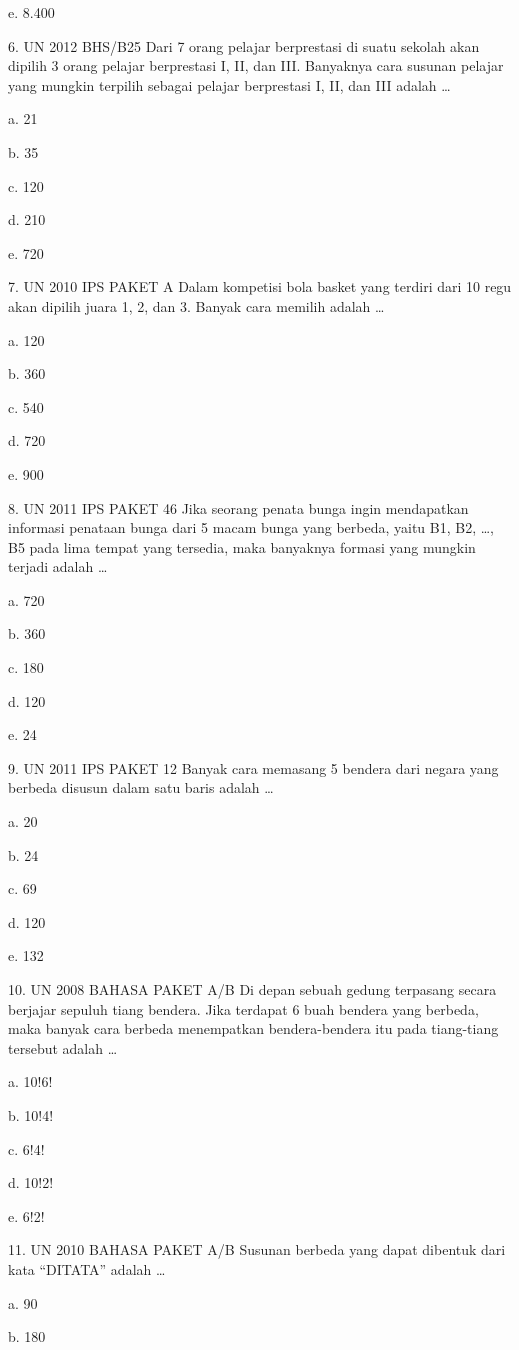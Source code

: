 \documentclass[11pt,fleqn]{book} %
\begin{document}
e.	8.400

6.	UN 2012 BHS/B25
Dari 7 orang pelajar berprestasi di suatu sekolah akan dipilih 3 orang pelajar berprestasi I, II, dan III. Banyaknya cara susunan pelajar yang mungkin terpilih sebagai pelajar berprestasi I, II, dan III adalah …

a.	21

b.	35

c.	120

d.	210

e.	720


7.	UN 2010 IPS PAKET A 
Dalam kompetisi bola basket yang terdiri dari 10 regu akan dipilih juara 1, 2, dan 3. Banyak cara memilih adalah …

a.	120

b.	360

c.	540

d.	720

e.	900

8.	UN 2011 IPS PAKET 46
Jika seorang penata bunga ingin mendapatkan informasi penataan bunga dari 5 macam bunga yang berbeda, yaitu B1, B2, …, B5 pada lima tempat yang tersedia, maka banyaknya formasi yang mungkin terjadi adalah …

a.	720

b.	360

c.	180

d.	120

e.	24

9.	UN 2011 IPS PAKET 12 
Banyak cara memasang 5 bendera dari negara yang berbeda disusun dalam satu baris adalah …

a.	20

b.	24

c.	69

d.	120

e.	132

10.	UN 2008 BAHASA PAKET A/B 
Di depan sebuah gedung terpasang secara berjajar sepuluh tiang bendera. Jika terdapat 6 buah bendera yang berbeda, maka banyak cara berbeda menempatkan bendera-bendera itu pada tiang-tiang tersebut adalah …

a.	10!6!

b.	10!4!

c.	6!4!

d.	10!2!

e.	6!2!

11.	UN 2010 BAHASA PAKET A/B 
Susunan berbeda yang dapat dibentuk dari kata “DITATA” adalah …

a.	90

b.	180
\end{document}

